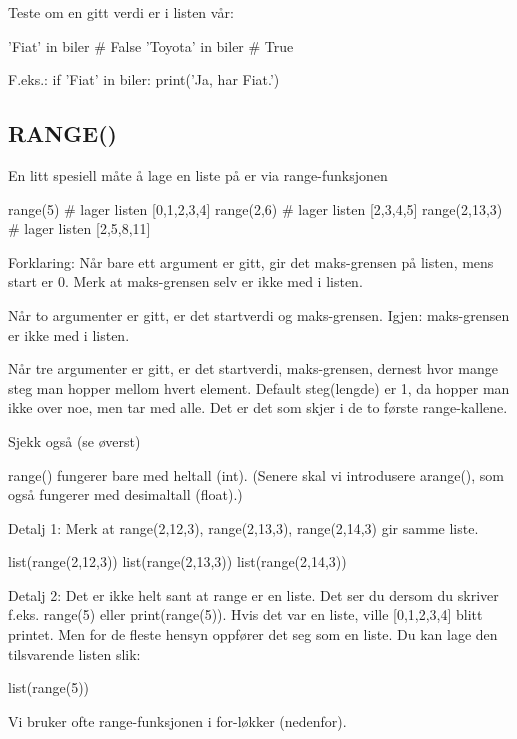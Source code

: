 Teste om en gitt verdi er i listen vår:
\begin{usncodebox}
'Fiat' in biler       # False
'Toyota' in biler     # True
\end{usncodebox}

F.eks.:
if 'Fiat' in biler:
   print('Ja, har Fiat.')

\subsection{RANGE()}

En litt spesiell måte å lage en liste på er via range-funksjonen
\begin{usncodebox}
range(5)        # lager listen [0,1,2,3,4]  
range(2,6)      # lager listen [2,3,4,5]
range(2,13,3)   # lager listen [2,5,8,11]
\end{usncodebox}

Forklaring: 
Når bare ett argument er gitt, gir det maks-grensen på listen, mens start er 0. Merk at maks-grensen selv er ikke med i listen.

Når to argumenter er gitt, er det startverdi og maks-grensen. Igjen: maks-grensen er ikke med i listen. 

Når tre argumenter er gitt, er det startverdi, maks-grensen, dernest hvor mange steg man hopper mellom hvert element. Default steg(lengde) er 1, da hopper man ikke over noe, men tar med alle. Det er det som skjer i de to første range-kallene. 

Sjekk også 
(se øverst) 

range() fungerer bare med heltall (int). (Senere skal vi introdusere arange(), som også fungerer med desimaltall (float).) 

Detalj 1: Merk at range(2,12,3), range(2,13,3), range(2,14,3) gir samme liste.
\begin{usncodebox}
list(range(2,12,3))
list(range(2,13,3))
list(range(2,14,3))
\end{usncodebox}

Detalj 2: Det er ikke helt sant at range er en liste. Det ser du dersom du skriver f.eks. range(5) eller print(range(5)). Hvis det var en liste, ville [0,1,2,3,4] blitt printet. Men for de fleste hensyn oppfører det seg som en liste. Du kan lage den tilsvarende listen slik:
\begin{usncodebox}
list(range(5))
\end{usncodebox}

Vi bruker ofte range-funksjonen i for-løkker (nedenfor). 

